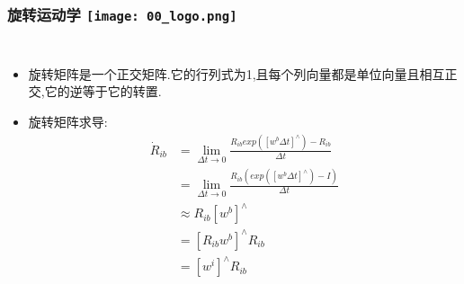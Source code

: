 
\begin{frame}
  \frametitle{旋转运动学 \hfill \texttt{[image: 00\_logo.png]}}
  \begin{columns}
    
    \begin{itemize}
      \item 旋转矩阵是一个正交矩阵.它的行列式为1,且每个列向量都是单位向量且相互正交,它的逆等于它的转置.

      \item 旋转矩阵求导:
      \begin{equation}
        \begin{split}
          \dot{R}_{ib} &= \lim_{\Delta t \to 0} \frac{R_{ib} exp([w^b\Delta t]^\land) - R_{ib}}{\Delta t} \\
          &= \lim_{\Delta t \to 0} \frac{R_{ib} (exp([w^b\Delta t]^\land) - I)}{\Delta t} \\
          &\approx R_{ib} [w^b]^\land  \\
          & = [R_{ib}w^b]^\land R_{ib} \\
          & = [w^i]^\land R_{ib}
        \end{split}
      \end{equation} 

    \end{itemize}


    
  
  \end{columns}
  \end{frame}   




